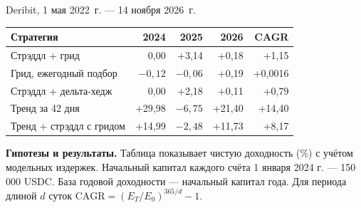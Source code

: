 \begingroup
\fontsize{12.6}{16}\selectfont
\noindent Deribit, 1 мая 2022~г. --- 14 ноября 2026~г.\par
\begin{center}\normalsize\begin{tabular}{lrrrr}\toprule
Стратегия & 2024 & 2025 & 2026 & CAGR\\\midrule
Стрэддл + грид & 0,00 & +3,14 & +0,18 & +1,15\\
Грид, ежегодный подбор & $-0{,}12$ & $-0{,}06$ & +0,19 & +0,0016\\
Стрэддл + дельта-хедж & 0,00 & +2,18 & +0,11 & +0,79\\
Тренд за 42 дня & +29,98 & $-6{,}75$ & +21,40 & +14,40\\
Тренд + стрэддл с гридом & +14,99 & $-2{,}48$ & +11,73 & +8,17\\\bottomrule
\end{tabular}\end{center}
\smallskip
\textbf{Гипотезы и результаты.} Таблица показывает чистую доходность (\%) с учётом модельных издержек. Начальный капитал каждого счёта 1 января 2024 г. --- 150\,000 USDC. База годовой доходности --- начальный капитал года. Для периода длиной $d$ суток $\mathrm{CAGR}=(E_T/E_0)^{365/d}-1$.
